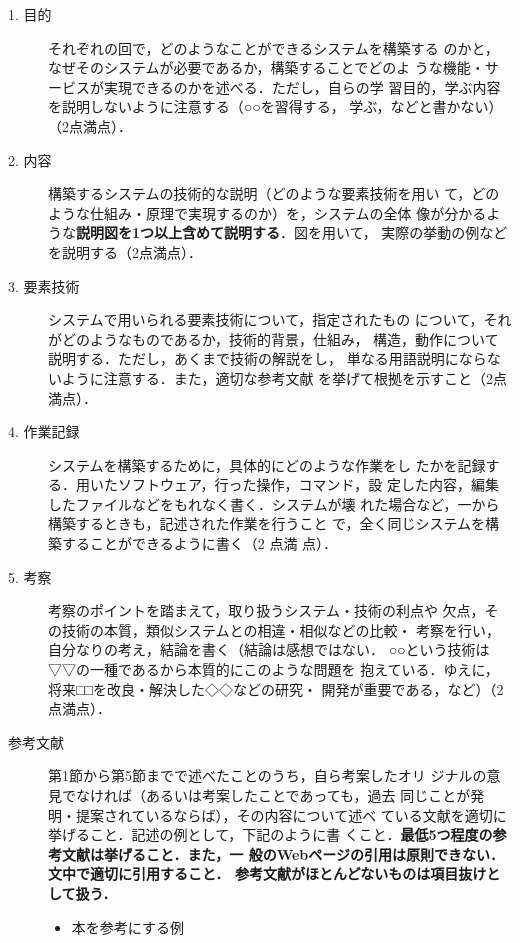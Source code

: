 \begin{description}
 \item[1. 目的] それぞれの回で，どのようなことができるシステムを構築する
	    のかと，なぜそのシステムが必要であるか，構築することでどのよ
	    うな機能・サービスが実現できるのかを述べる．ただし，自らの学
	    習目的，学ぶ内容を説明しないように注意する（○○を習得する，
	    学ぶ，などと書かない）（2点満点）．
 \item[2. 内容] 構築するシステムの技術的な説明（どのような要素技術を用い
	    て，どのような仕組み・原理で実現するのか）を，システムの全体
	    像が分かるような\textbf{説明図を1つ以上含めて説明する}．図を用いて，
	    実際の挙動の例などを説明する（2点満点）．
 \item[3. 要素技術] システムで用いられる要素技術について，指定されたもの
	    について，それがどのようなものであるか，技術的背景，仕組み，
	    構造，動作について説明する．ただし，あくまで技術の解説をし，
	    単なる用語説明にならないように注意する．また，適切な参考文献
	    を挙げて根拠を示すこと（2点満点）．
 \item[4. 作業記録] システムを構築するために，具体的にどのような作業をし
	    たかを記録する．用いたソフトウェア，行った操作，コマンド，設
	    定した内容，編集したファイルなどをもれなく書く．システムが壊
	    れた場合など，一から構築するときも，記述された作業を行うこと
	    で，全く同じシステムを構築することができるように書く（2 点満
	    点）．
 \item[5. 考察] 考察のポイントを踏まえて，取り扱うシステム・技術の利点や
	    欠点，その技術の本質，類似システムとの相違・相似などの比較・
	    考察を行い，自分なりの考え，結論を書く（結論は感想ではない．
	    ○○という技術は▽▽の一種であるから本質的にこのような問題を
	    抱えている．ゆえに，将来□□を改良・解決した◇◇などの研究・
	    開発が重要である，など）（2点満点）．
 \item[参考文献] 第1節から第5節までで述べたことのうち，自ら考案したオリ
	    ジナルの意見でなければ（あるいは考案したことであっても，過去
	    同じことが発明・提案されているならば），その内容について述べ
	    ている文献を適切に挙げること．記述の例として，下記のように書
	    くこと．\textbf{最低5つ程度の参考文献は挙げること．また，一
	    般のWebページの引用は原則できない．文中で適切に引用すること．
	    参考文献がほとんどないものは項目抜けとして扱う．}

	    \begin{itemize}
	     \item 本を参考にする例\\


\end{itemize}
\end{description}

